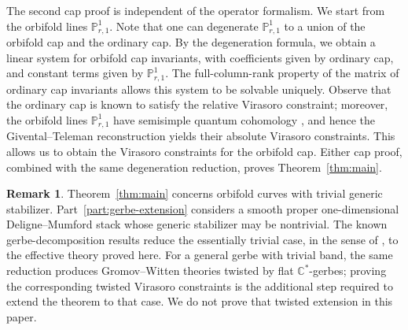 \documentclass[letterpaper,12pt]{amsart}
\theoremstyle{definition}
\newtheorem{rmk}[thm]{Remark}
\newcommand{\C}{\mathbb C}
\newcommand{\PP}{\mathbb P}
\numberwithin{equation}{section}
\begin{document}
The second cap proof is independent of the operator formalism. We start from the orbifold lines \(\PP^{1}_{r,1}\). Note that one can degenerate \(\PP^{1}_{r,1}\) to a union of the orbifold cap and the ordinary cap. By the degeneration formula, we obtain a linear system for orbifold cap invariants, with coefficients given by ordinary cap, and constant terms given by \(\PP^{1}_{r,1}\). The full-column-rank property \cite{OP3} of the matrix of ordinary cap invariants allows this system to be solvable uniquely. Observe that the ordinary cap is known to satisfy the relative Virasoro constraint; moreover, the orbifold lines \(\PP^{1}_{r,1}\) have semisimple quantum cohomology \cite{MT1}, and hence the Givental--Teleman reconstruction yields their absolute Virasoro constraints. This allows us to obtain the Virasoro constraints for the orbifold cap. Either cap proof, combined with the same degeneration reduction, proves Theorem~\ref{thm:main}.



\begin{rmk}
Theorem~\ref{thm:main} concerns orbifold curves with trivial generic
stabilizer.  Part~\ref{part:gerbe-extension} considers a smooth proper
one-dimensional Deligne--Mumford stack whose generic stabilizer may be
nontrivial.  The known gerbe-decomposition results reduce the essentially
trivial case, in the sense of \cite{FMN}, to the effective theory proved
here.  For a general gerbe with
trivial band, the same reduction produces Gromov--Witten theories twisted by
flat \(\C^*\)-gerbes; proving the corresponding twisted Virasoro constraints
is the additional step required to extend the theorem to that case. We do
not prove that twisted extension in this paper.
\end{rmk}
\end{document}
